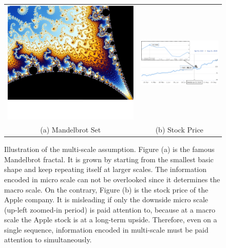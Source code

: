 \begin{figure}[h]
  \centering
  \begin{tabular}{cc}
    \includegraphics[width=0.35\linewidth]{figures/fractal.png}
    &
      \includegraphics[width=0.65\linewidth]{figures/stock.png}\\
    {\small (a) Mandelbrot Set}& {\small (b) Stock Price}\\
  \end{tabular}
  \caption{\label{fig:intro_fractal} Illustration of the
    multi-scale assumption. Figure (a) is the famous Mandelbrot
    fractal. It is grown by starting from the smallest basic
    shape and keep repeating itself at larger scales. The
    information encoded in micro scale can not be overlooked
    since it determines the macro scale. On the contrary, Figure
    (b) is the stock price of the Apple company. It is misleading
    if only the downside micro scale (up-left zoomed-in period)
    is paid attention to, because at a macro scale the Apple
    stock is at a long-term upside. Therefore, even on a single
    sequence, information encoded in multi-scale must be paid
    attention to simultaneously.}
\end{figure}

